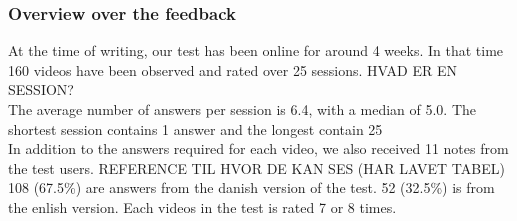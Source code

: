 \subsubsection{Overview over the feedback}
%
At the time of writing, our test has been online for around 4 weeks. In that time 160 videos have been observed and rated over 25 sessions. HVAD ER EN SESSION?\\
The average number of answers per session is 6.4, with a median of 5.0. The shortest session contains 1 answer and the longest contain 25\\
In addition to the answers required for each video, we also received 11 notes from the test users. REFERENCE TIL HVOR DE KAN SES (HAR LAVET TABEL)\\
108 (67.5\%) are answers from the danish version of the test. 52 (32.5\%) is from the enlish version. Each videos in the test is rated 7 or 8 times.
%
